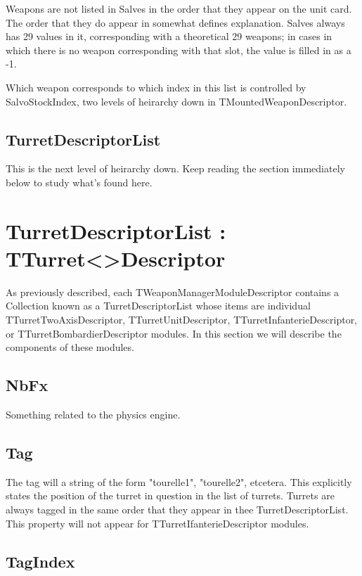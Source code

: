 \documentclass{article}
\begin{document}
Weapons are not listed in Salves in the order that they appear on the unit card. The order that they do appear in somewhat defines explanation. Salves always has 29 values in it, corresponding with a theoretical 29 weapons; in cases in which there is no weapon corresponding with that slot, the value is filled in as a -1.

Which weapon corresponds to which index in this list is controlled by SalvoStockIndex, two levels of heirarchy down in TMountedWeaponDescriptor.

\subsection{TurretDescriptorList}

This is the next level of heirarchy down. Keep reading the section immediately below to study what's found here.

\section{TurretDescriptorList : TTurret\textless *\textgreater Descriptor}

As previously described, each TWeaponManagerModuleDescriptor contains a Collection known as a TurretDescriptorList whose items are individual TTurretTwoAxisDescriptor, TTurretUnitDescriptor, TTurretInfanterieDescriptor, or TTurretBombardierDescriptor modules. In this section we will describe the components of these modules.

\subsection{NbFx}

Something related to the physics engine.

\subsection{Tag}

The tag will a string of the form "tourelle1", "tourelle2", etcetera. This explicitly states the position of the turret in question in the list of turrets. Turrets are always tagged in the same order that they appear in thee TurretDescriptorList. This property will not appear for TTurretIfanterieDescriptor modules.

\subsection{TagIndex}
\end{document}
